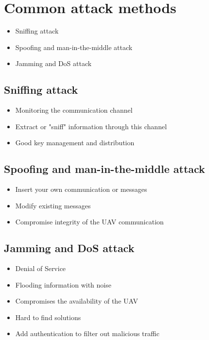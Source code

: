 \section{Common attack methods}
\begin{frame}{\insertsection}
    \begin{itemize}
        \item Sniffing attack
        \item Spoofing and man-in-the-middle attack
        \item Jamming and DoS attack
    \end{itemize}
\end{frame}

\subsection{Sniffing attack}
\begin{frame}{\insertsubsection}
    \begin{itemize}
        \item Monitoring the communication channel
        \item Extract or "sniff" information through this channel
        \item Good key management and distribution
    \end{itemize}
\end{frame}

\subsection{Spoofing and man-in-the-middle attack}
\begin{frame}{\insertsubsection}
    \begin{itemize}
        \item Insert your own communication or messages
        \item Modify existing messages
        \item Compromise integrity of the UAV communication
    \end{itemize}
\end{frame}

\subsection{Jamming and DoS attack}
\begin{frame}{\insertsubsection}
    \begin{itemize}
        \item Denial of Service
        \item Flooding information with noise
        \item Compromises the availability of the UAV
        \item Hard to find solutions
        \item Add authentication to filter out malicious traffic
    \end{itemize}
\end{frame}

